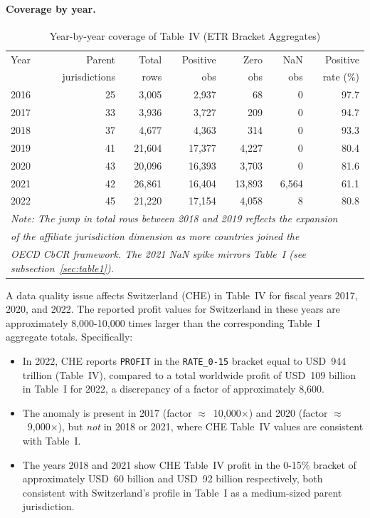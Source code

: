 \documentclass[11pt,a4paper]{article}
\newcommand{\code}[1]{\texttt{#1}}
\begin{document}
\paragraph{Coverage by year.}
\begin{table}[H]
\centering
\caption{Year-by-year coverage of Table~IV (ETR Bracket Aggregates)}
\label{tab:t4yearcoverage}
\begin{tabular}{@{}lrrrrrr@{}}
\toprule
Year & Parent & Total & Positive & Zero & NaN & Positive \\
 & jurisdictions & rows & obs & obs & obs & rate (\%) \\
\midrule
2016 & 25 & 3,005 & 2,937 & 68 & 0 & 97.7 \\
2017 & 33 & 3,936 & 3,727 & 209 & 0 & 94.7 \\
2018 & 37 & 4,677 & 4,363 & 314 & 0 & 93.3 \\
2019 & 41 & 21,604 & 17,377 & 4,227 & 0 & 80.4 \\
2020 & 43 & 20,096 & 16,393 & 3,703 & 0 & 81.6 \\
2021 & 42 & 26,861 & 16,404 & 13,893 & 6,564 & 61.1 \\
2022 & 45 & 21,220 & 17,154 & 4,058 & 8 & 80.8 \\
\midrule
\multicolumn{7}{l}{\small\textit{Note: The jump in total rows between 2018 and 2019 reflects the expansion}} \\
\multicolumn{7}{l}{\small\textit{of the affiliate jurisdiction dimension as more countries joined the}} \\
\multicolumn{7}{l}{\small\textit{OECD CbCR framework. The 2021 NaN spike mirrors Table~I (see subsection~\ref{sec:table1}).}} \\
\bottomrule
\end{tabular}
\end{table}

A data quality issue affects Switzerland (CHE) in Table~IV for fiscal years 2017, 2020, and 2022. The reported profit values for Switzerland in these years are approximately 8,000-10,000 times larger than the corresponding Table~I aggregate totals. Specifically:

\begin{itemize}
  \item In 2022, CHE reports \code{PROFIT} in the \code{RATE\_0-15} bracket
          equal to USD~944 trillion (Table~IV), compared to a total worldwide
          profit of USD~109 billion in Table~I for 2022, a discrepancy of a
          factor of approximately 8,600.
    \item The anomaly is present in 2017 (factor $\approx$~10,000$\times$)
          and 2020 (factor $\approx$~9,000$\times$), but \emph{not} in
          2018 or 2021, where CHE Table~IV values are consistent with Table~I.
    \item The years 2018 and 2021 show CHE Table~IV profit in the 0-15\%
          bracket of approximately USD~60 billion and USD~92 billion
          respectively, both consistent with Switzerland's profile in Table~I
          as a medium-sized parent jurisdiction.
\end{itemize}
\end{document}
